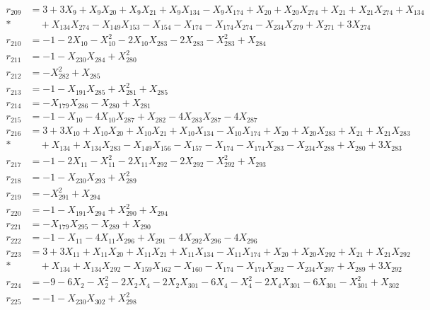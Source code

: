\begin{align*}
r_{209} &= 3 + 3X_{9} + X_{9}X_{20} + X_{9}X_{21} + X_{9}X_{134} - X_{9}X_{174} + X_{20} + X_{20}X_{274} + X_{21} + X_{21}X_{274} + X_{134} \\*
&\quad  + X_{134}X_{274} - X_{149}X_{153} - X_{154} - X_{174} - X_{174}X_{274} - X_{234}X_{279} + X_{271} + 3X_{274} \\[3pt]
r_{210} &= -1 - 2X_{10} - X_{10}^{2} - 2X_{10}X_{283} - 2X_{283} - X_{283}^{2} + X_{284} \\[3pt]
r_{211} &= -1 - X_{230}X_{284} + X_{280}^{2} \\[3pt]
r_{212} &= -X_{282}^{2} + X_{285} \\[3pt]
r_{213} &= -1 - X_{191}X_{285} + X_{281}^{2} + X_{285} \\[3pt]
r_{214} &= -X_{179}X_{286} - X_{280} + X_{281} \\[3pt]
r_{215} &= -1 - X_{10} - 4X_{10}X_{287} + X_{282} - 4X_{283}X_{287} - 4X_{287} \\[3pt]
r_{216} &= 3 + 3X_{10} + X_{10}X_{20} + X_{10}X_{21} + X_{10}X_{134} - X_{10}X_{174} + X_{20} + X_{20}X_{283} + X_{21} + X_{21}X_{283} \\*
&\quad  + X_{134} + X_{134}X_{283} - X_{149}X_{156} - X_{157} - X_{174} - X_{174}X_{283} - X_{234}X_{288} + X_{280} + 3X_{283} \\[3pt]
r_{217} &= -1 - 2X_{11} - X_{11}^{2} - 2X_{11}X_{292} - 2X_{292} - X_{292}^{2} + X_{293} \\[3pt]
r_{218} &= -1 - X_{230}X_{293} + X_{289}^{2} \\[3pt]
r_{219} &= -X_{291}^{2} + X_{294} \\[3pt]
r_{220} &= -1 - X_{191}X_{294} + X_{290}^{2} + X_{294} \\[3pt]
r_{221} &= -X_{179}X_{295} - X_{289} + X_{290} \\[3pt]
r_{222} &= -1 - X_{11} - 4X_{11}X_{296} + X_{291} - 4X_{292}X_{296} - 4X_{296} \\[3pt]
r_{223} &= 3 + 3X_{11} + X_{11}X_{20} + X_{11}X_{21} + X_{11}X_{134} - X_{11}X_{174} + X_{20} + X_{20}X_{292} + X_{21} + X_{21}X_{292} \\*
&\quad  + X_{134} + X_{134}X_{292} - X_{159}X_{162} - X_{160} - X_{174} - X_{174}X_{292} - X_{234}X_{297} + X_{289} + 3X_{292} \\[3pt]
r_{224} &= -9 - 6X_{2} - X_{2}^{2} - 2X_{2}X_{4} - 2X_{2}X_{301} - 6X_{4} - X_{4}^{2} - 2X_{4}X_{301} - 6X_{301} - X_{301}^{2} + X_{302} \\[3pt]
r_{225} &= -1 - X_{230}X_{302} + X_{298}^{2} \\[3pt]

\end{align*}

